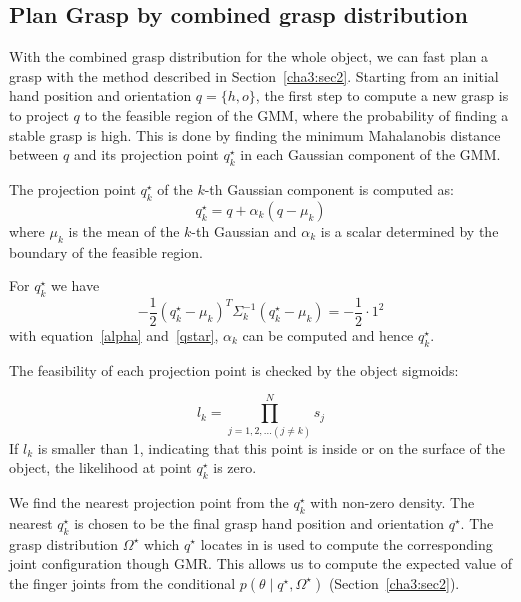 \subsection{Plan Grasp by combined grasp distribution}
\label{cha3:sec4:plan}

With the combined grasp distribution for the whole object, we can fast plan a grasp with the method described in Section~\ref{cha3:sec2}. Starting from an initial hand position and orientation $q = \{h, o\}$, the first step to compute a new grasp is to project $q$ to the feasible region of the GMM, where the probability of finding a stable grasp is high. This is done by finding the minimum Mahalanobis distance between $q$ and its projection point $q_k^\star$ in each Gaussian component of the GMM.

The projection point $q_k^{\star}$ of the $k$-th Gaussian component is computed as:
\begin{equation} \label{alpha}
q_k^{\star} = q + \alpha_k\left(q-\mu_k\right)
\end{equation}
where $\mu_k$ is the mean of the $k$-th Gaussian and $\alpha_k$ is a scalar determined by the boundary of the feasible region.

For $q_k^{\star}$ we have
\begin{equation} \label{qstar}
-\frac{1}{2}\left(q_k^{\star}-\mu_k\right)^T\Sigma_k^{-1}\left(q_k^\star-\mu_k\right)=-\frac{1}{2}\cdot{1}^{2}
\end{equation}
with equation~\ref{alpha} and~\ref{qstar}, $\alpha_k$ can be computed and hence $q_k^{\star}$.

The feasibility of each projection point is checked by the object sigmoids:

\begin{equation}
l_k = \prod_{j=1,2,...\left(j\neq{k}\right)}^N{s_j}
\end{equation}
If $l_k$ is smaller than 1, indicating that this point is inside or on the surface of the object, the likelihood at point $q^{\star}_k$ is zero.

We find the nearest projection point from the $q_k^\star$ with non-zero density. The nearest $q_k^\star$ is chosen to be the final grasp hand position and orientation $q^\star$. The grasp distribution $\Omega^{\star}$ which $q^{\star}$ locates in is used to compute the corresponding joint configuration though GMR. This allows us to compute the expected value of the finger joints from the conditional $p\left(\theta\mid{q^{\star}},\Omega^{\star}\right)$ (Section~\ref{cha3:sec2}). 